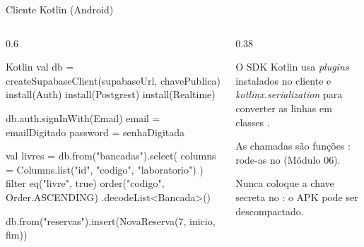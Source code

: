 \documentclass[aspectratio=169,10pt]{beamer}
\begin{document}
\begin{frame}[fragile]{Cliente Kotlin (Android)}
  \begin{columns}[T]
    \begin{column}{0.6\textwidth}
\begin{codigo}[title=supabase-kt]{Kotlin}
val db = createSupabaseClient(supabaseUrl, chavePublica) {
  install(Auth)
  install(Postgrest)
  install(Realtime)
}

db.auth.signInWith(Email) {
  email = emailDigitado
  password = senhaDigitada
}

val livres = db.from("bancadas").select(
    columns = Columns.list("id", "codigo", "laboratorio")
) {
  filter { eq("livre", true) }
  order("codigo", Order.ASCENDING)
}.decodeList<Bancada>()

db.from("reservas").insert(NovaReserva(7, inicio, fim))
\end{codigo}
    \end{column}
    \begin{column}{0.38\textwidth}
      \begin{conceito}
        O SDK Kotlin usa \emph{plugins} instalados no cliente e \emph{kotlinx.serialization} para converter as linhas em classes .
      \end{conceito}
      \begin{dica}
        As chamadas são funções : rode-as no  (Módulo 06).
      \end{dica}
      \begin{atencao}
        Nunca coloque a chave secreta no : o APK pode ser descompactado.
      \end{atencao}
    \end{column}
  \end{columns}
\end{frame}
\end{document}
